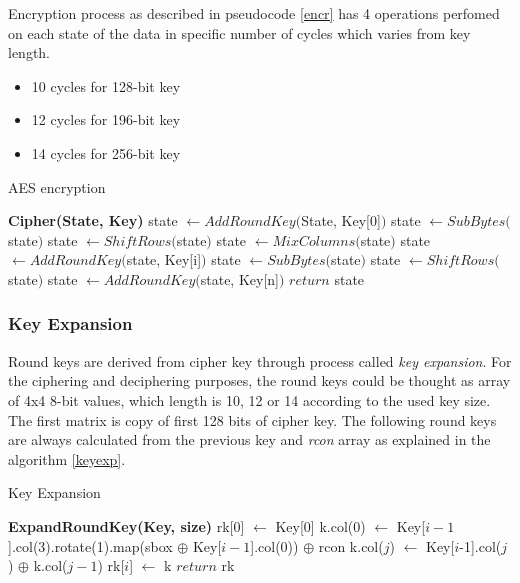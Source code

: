 Encryption process as described in pseudocode \ref{encr} has 4 operations 
perfomed on each state of the data in specific number of cycles which 
varies from key length.
\begin{itemize}
\item 10 cycles for 128-bit key
\item 12 cycles for 196-bit key
\item 14 cycles for 256-bit key
\end{itemize}

\begin{algorithm}
\caption{AES encryption}
\label{encr}
\begin{algorithmic}
\State \textbf{Cipher(State, Key)}
\State state $\gets AddRoundKey($State, Key[0]$)$
\vspace{0.5em}
    \State state $\gets SubBytes($state$)$
    \State state $\gets ShiftRows($state$)$
    \State state $\gets MixColumns($state$)$
    \State state $\gets AddRoundKey($state, Key[i]$)$
\EndFor
\vspace{0.5em}
\State state $\gets SubBytes($state$)$
\State state $\gets ShiftRows($state$)$
\State state $\gets AddRoundKey($state, Key[n]$)$
\vspace{0.5em}
\State $return$ state
\end{algorithmic}
\end{algorithm}

\subsubsection*{Key Expansion}
Round keys are derived from cipher key through process called \textit{key 
expansion}. For the ciphering and deciphering purposes, the round keys could be 
thought as array of 4x4 8-bit values, which length is 10, 12 or 14 according to 
the used key size. The first matrix is copy of first 128 bits of cipher key. The
following round keys are always calculated from the previous key and 
\textit{rcon} array as explained in the algorithm \ref{keyexp}.

\begin{algorithm}[H]
\caption{Key Expansion}
\label{keyexp}
\begin{algorithmic}
\State \textbf{ExpandRoundKey(Key, size)}
\State rk[0] $\gets$ Key[0]
\vspace{0.5em}
    \State k.col(0) $\gets$ Key[$i-1$].col(3).rotate(1).map(sbox 
	    $\oplus$ Key[$i-1$].col(0)) $\oplus$ rcon
        \State k.col($j$) $\gets$ Key[$i$-1].col($j$) $\oplus$ k.col($j-1$)
    \EndFor
    \State rk[$i$] $\gets$ k
\EndFor
\vspace{0.5em}
\State $return$ rk
\end{algorithmic}
\end{algorithm}


